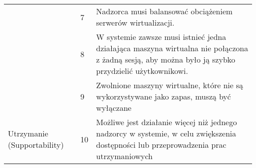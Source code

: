 \documentclass[../wstep.tex]{subfiles}
\begin{document}
\begin{table}[H]
\begin{tabular}{|p{}|p{}|p{}|}
                                                        & 7            & Nadzorca musi balansować obciążeniem serwerów wirtualizacji.                                                                                                                                                                 \\ \cline{2-3}
                                                        & 8            & W systemie zawsze musi istnieć jedna działająca maszyna wirtualna nie połączona z żadną sesją, aby można było ją szybko przydzielić użytkownikowi.                                                                         \\ \cline{2-3}
                                                        & 9            & Zwolnione maszyny wirtualne, które nie są wykorzystywane jako zapas, muszą być wyłączane                                                                                                                                   \\ \hline
        \multirow[t]{3}{=}{Utrzymanie (Supportability)} & 10           & Możliwe jest działanie więcej niż jednego nadzorcy w systemie, w celu zwiększenia dostępności lub przeprowadzenia prac utrzymaniowych                                                                                      \\
        \hline
    \end{tabular}
\end{table}
\end{document}
